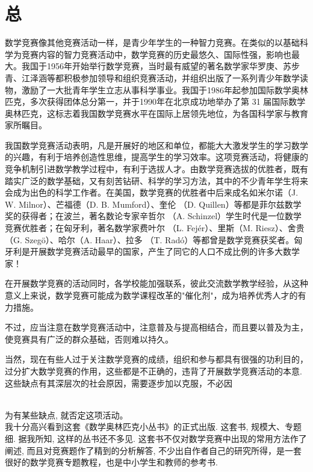 \documentclass[10pt]{article}
\begin{document}
\section{总}
数学竞赛像其他竞赛活动一样，是青少年学生的一种智力竞赛。在类似的以基础科学为竞赛内容的智力竞赛活动中，数学竞赛的历史最悠久、国际性强，影响也最大。我国于1956年开始举行数学竞赛，当时最有威望的著名数学家华罗庚、苏步青、江泽涵等都积极参加领导和组织竞赛活动，并组织出版了一系列青少年数学读物，激励了一大批青年学生立志从事科学事业。我国于1986年起参加国际数学奥林匹克，多次获得团体总分第一，并于1990年在北京成功地举办了第 31 届国际数学奥林匹克，这标志着我国数学竞赛水平在国际上居领先地位，为各国科学家与教育家所瞩目。

我国数学竞赛活动表明，凡是开展好的地区和单位，都能大大激发学生的学习数学的兴趣，有利于培养创造性思维，提高学生的学习效率。这项竞赛活动，将健康的竞争机制引进数学教学过程中，有利于选拔人才。由数学竞赛选拔的优胜者，既有踏实广泛的数学基础，又有刻苦钻研、科学的学习方法，其中的不少青年学生将来会成为出色的科学工作者。在美国，数学竞赛的优胜者中后来成名如米尔诺（J. W. Milnor）、芒福德（D. B. Mumford）、奎伦 （D. Quillen）等都是菲尔兹数学奖的获得者；在波兰，著名数论专家辛哲尔 （A. Schinzel）学生时代是一位数学竞赛优胜者；在匈牙利，著名数学家费叶尔 （L. Fejér）、里斯（M. Riesz）、舍贵（G. Szegö）、哈尔（A. Haar）、拉多 （T. Radó）等都曾是数学竞赛获奖者。匈牙利是开展数学竞赛活动最早的国家，产生了同它的人口不成比例的许多大数学家！

在开展数学竞赛的活动同时，各学校能加强联系，彼此交流数学教学经验，从这种意义上来说，数学竞赛可能成为数学课程改革的"催化剂"，成为培养优秀人才的有力措施。

不过，应当注意在数学竞赛活动中，注意普及与提高相结合，而且要以普及为主，使竞赛具有广泛的群众基础，否则难以持久。

当然，现在有些人过于关注数学竞赛的成绩，组织和参与都具有很强的功利目的，过分扩大数学竞赛的作用，这些都是不正确的，违背了开展数学竞赛活动的本意. 这些缺点有其深层次的社会原因，需要逐步加以克服，不必因\\
$\qquad$

为有某些缺点, 就否定这项活动。\\
我十分高兴看到这套《数学奥林匹克小丛书》的正式出版. 这套书, 规模大、专题细. 据我所知, 这样的丛书还不多见. 这套书不仅对数学竞赛中出现的常用方法作了阐述, 而且对竞赛题作了精到的分析解答, 不少出自作者自己的研究所得，是一套很好的数学竞赛专题教程，也是中小学生和教师的参考书.
\end{document}
